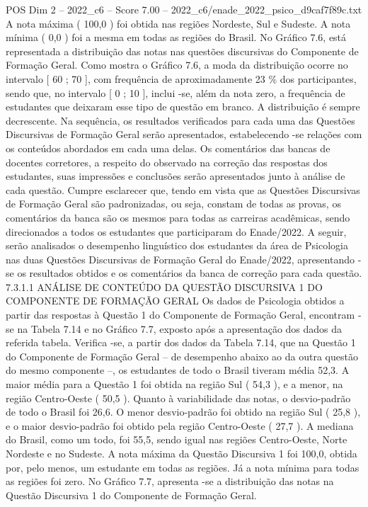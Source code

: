 \begin{textsample}{POS Dim 2 – 2022\_c6 – Score 7.00 – 2022\_c6/enade\_2022\_psico\_d9caf7f89c.txt}
A nota máxima ( 100,0 ) foi obtida nas regiões Nordeste, Sul e Sudeste.
A nota mínima ( 0,0 ) foi a mesma em todas as regiões do Brasil.
No Gráfico 7.6, está representada a distribuição das notas nas questões discursivas do Componente de Formação Geral.
Como mostra o Gráfico 7.6, a moda da distribuição ocorre no intervalo [ 60 ; 70 ], com frequência de aproximadamente 23 \% dos participantes, sendo que, no intervalo [ 0 ; 10 ], inclui -se, além da nota zero, a frequência de estudantes que deixaram esse tipo de questão em branco.
A distribuição é sempre decrescente.
Na sequência, os resultados verificados para cada uma das Questões Discursivas de Formação Geral serão apresentados, estabelecendo -se relações com os conteúdos abordados em cada uma delas.
Os comentários das bancas de docentes corretores, a respeito do observado na correção das respostas dos estudantes, suas impressões e conclusões serão apresentados junto à análise de cada questão.
Cumpre esclarecer que, tendo em vista que as Questões Discursivas de Formação Geral são padronizadas, ou seja, constam de todas as provas, os comentários da banca são os mesmos para todas as carreiras acadêmicas, sendo direcionados a todos os estudantes que participaram do Enade/2022.
A seguir, serão analisados o desempenho linguístico dos estudantes da área de Psicologia nas duas Questões Discursivas de Formação Geral do Enade/2022, apresentando -se os resultados obtidos e os comentários da banca de correção para cada questão. 7.3.1.1 ANÁLISE DE CONTEÚDO DA QUESTÃO DISCURSIVA 1 DO COMPONENTE DE FORMAÇÃO GERAL Os dados de Psicologia obtidos a partir das respostas à Questão 1 do Componente de Formação Geral, encontram -se na Tabela 7.14 e no Gráfico 7.7, exposto após a apresentação dos dados da referida tabela.
Verifica -se, a partir dos dados da Tabela 7.14, que na Questão 1 do Componente de Formação Geral – de desempenho abaixo ao da outra questão do mesmo componente –, os estudantes de todo o Brasil tiveram média 52,3.
A maior média para a Questão 1 foi obtida na região Sul ( 54,3 ), e a menor, na região Centro-Oeste ( 50,5 ).
Quanto à variabilidade das notas, o desvio-padrão de todo o Brasil foi 26,6.
O menor desvio-padrão foi obtido na região Sul ( 25,8 ), e o maior desvio-padrão foi obtido pela região Centro-Oeste ( 27,7 ).
A mediana do Brasil, como um todo, foi 55,5, sendo igual nas regiões Centro-Oeste, Norte Nordeste e no Sudeste.
A nota máxima da Questão Discursiva 1 foi 100,0, obtida por, pelo menos, um estudante em todas as regiões.
Já a nota mínima para todas as regiões foi zero.
No Gráfico 7.7, apresenta -se a distribuição das notas na Questão Discursiva 1 do Componente de Formação Geral.

\end{textsample}
